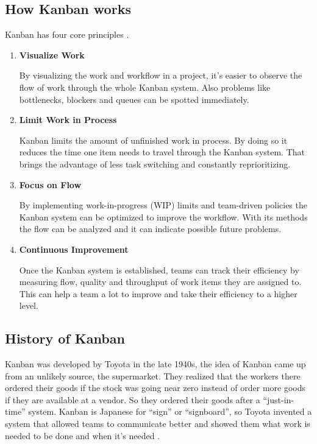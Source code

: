 \subsection{How Kanban works}
Kanban has four core principles \autocite{WhatIsKanban}.
\begin{enumerate}
    \item \textbf{Visualize Work}

    By visualizing the work and workflow in a project, it's easier to observe the flow of work through the whole Kanban system. Also problems like bottlenecks, blockers and queues can be spotted immediately.

    \item \textbf{Limit Work in Process}

    Kanban limits the amount of unfinished work in process. By doing so it reduces the time one item needs to travel through the Kanban system. That brings the advantage of less task switching and constantly reprioritizing.

    \item \textbf{Focus on Flow}

    By implementing work-in-progress (WIP) limits and team-driven policies the Kanban system can be optimized to improve the workflow. With its methods the flow can be analyzed and it can indicate possible future problems.

    \item \textbf{Continuous Improvement}

    Once the Kanban system is established, teams can track their efficiency by measuring flow, quality and throughput of work items they are assigned to. This can help a team a lot to improve and take their efficiency to a higher level.
\end{enumerate}

\subsection{History of Kanban}
Kanban was developed by Toyota in the late 1940s, the idea of Kanban came up from an unlikely source, the supermarket. They realized that the workers there ordered their goods if the stock was going near zero instead of order more goods if they are available at a vendor. So they ordered their goods after a ``just-in-time'' system. Kanban is Japanese for ``sign'' or ``signboard'', so Toyota invented a system that allowed teams to communicate better and showed them what work is needed to be done and when it's needed \autocite{WhatIsKanban}.

